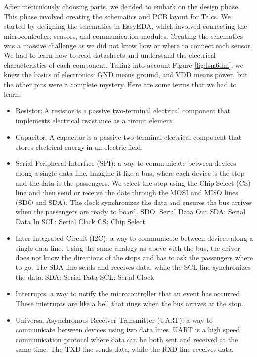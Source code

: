 \documentclass{article}
\begin{document}
\qquad After meticulously choosing parts, we decided to embark on the design phase. This phase involved creating the schematics and PCB layout for Talos. We started by designing the schematics in EasyEDA, which involved connecting the microcontroller, sensors, and communication modules. Creating the schematics was a massive challenge as we did not know how or where to connect each sensor. We had to learn how to read datasheets and understand the electrical characteristics of each component. Taking into account Figure \ref{fig:lsm6dm}, we knew the basics of electronics: GND means ground, and VDD means power, but the other pins were a complete mystery. Here are some terms that we had to learn:
\begin{itemize}
      \item Resistor: A resistor is a passive two-terminal electrical component that implements electrical resistance as a circuit element.
      \item Capacitor: A capacitor is a passive two-terminal electrical component that stores electrical energy in an electric field.
      \item Serial Peripheral Interface (SPI): a way to communicate between devices along a single data line. Imagine it like a bus, where each device is the stop and the data is the passengers. We select the stop using the Chip Select (CS) line and then send or receive the date through the MOSI and MISO lines (SDO and SDA). The clock synchronizes the data and ensures the bus arrives when the passengers are ready to board.
            \subitem SDO: Serial Data Out
            \subitem SDA: Serial Data In
            \subitem SCL: Serial Clock
            \subitem CS: Chip Select
      \item Inter-Integrated Circuit (I2C): a way to communicate between devices along a single data line. Using the same analogy as above with the bus, the driver does not know the directions of the stops and has to ask the passengers where to go. The SDA line sends and receives data, while the SCL line synchronizes the data.
            \subitem SDA: Serial Data
            \subitem SCL: Serial Clock
      \item Interrupts: a way to notify the microcontroller that an event has occurred. These interrupts are like a bell that rings when the bus arrives at the stop.
      \item Universal Asynchronous Receiver-Transmitter (UART): a way to communicate between devices using two data lines. UART is a high speed communication protocol where data can be both sent and received at the same time. The TXD line sends data, while the RXD line receives data.

\end{itemize}
\end{document}
